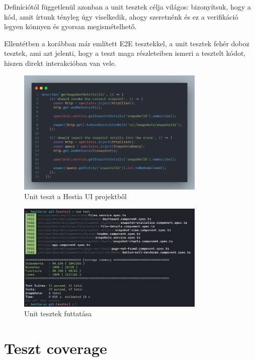 Definíciótól függetlenül azonban a unit tesztek célja világos: bizonyítsuk, hogy a kód, amit írtunk tényleg úgy viselkedik, ahogy szeretnénk és ez a verifikáció legyen könnyen és gyorsan megismételhető.

Ellentétben a korábban már említett E2E tesztekkel, a unit tesztek fehér doboz tesztek, ami azt jelenti, hogy a teszt maga részleteiben ismeri a tesztelt kódot, hiszen direkt interakcióban van vele.

\begin{figure}[H]
    \centering
    \includegraphics[width=0.8\textwidth]{images/unit-test.png}
    \caption{Unit teszt a Hestia UI projektből}
    \label{fig:unit-test-example}
\end{figure}

\begin{figure}[H]
    \centering
    \includegraphics[width=0.8\textwidth]{images/testRun.png}
    \caption{Unit tesztek futtatása}
    \label{fig:unit-test-run-example}
\end{figure}

\section{Teszt coverage}

